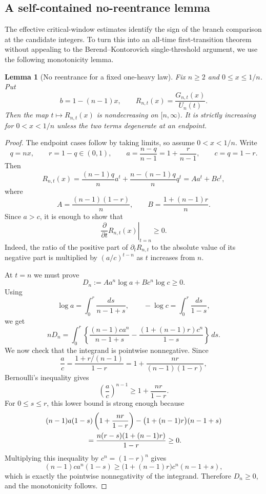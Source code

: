 \documentclass[11pt]{article}
\newtheorem{lemma}[theorem]{Lemma}
\theoremstyle{definition}
\begin{document}
\subsection{A self-contained no-reentrance lemma}

The effective critical-window estimates identify the sign of the branch comparison at the candidate integers.  To turn this into an all-time first-transition theorem without appealing to the Berend--Kontorovich single-threshold argument, we use the following monotonicity lemma.

\begin{lemma}[No reentrance for a fixed one-heavy law]\label{lem:no-reentrance-fixed}
Fix $n\ge2$ and $0\le x\le 1/n$.  Put
\[
  b=1-(n-1)x,
  \qquad
  R_{n,t}(x)=\frac{G_{n,t}(x)}{U_n(t)}.
\]
Then the map $t\mapsto R_{n,t}(x)$ is nondecreasing on $[n,\infty)$.  It is strictly increasing for $0<x<1/n$ unless the two terms degenerate at an endpoint.
\end{lemma}

\begin{proof}
The endpoint cases follow by taking limits, so assume $0<x<1/n$.  Write
\[
  q=nx,
  \qquad
  r=1-q\in(0,1),
  \qquad
  a=\frac{n-q}{n-1}=1+\frac{r}{n-1},
  \qquad
  c=q=1-r.
\]
Then
\[
  R_{n,t}(x)
  =\frac{(n-1)q}{n}a^t+\frac{n-(n-1)q}{n}q^t
  =A a^t+B c^t,
\]
where
\[
  A=\frac{(n-1)(1-r)}{n},
  \qquad
  B=\frac{1+(n-1)r}{n}.
\]
Since $a>c$, it is enough to show that
\[
  \left.\frac{\partial}{\partial t}R_{n,t}(x)\right|_{t=n}\ge0.
\]
Indeed, the ratio of the positive part of $\partial_tR_{n,t}$ to the absolute value of its negative part is multiplied by $(a/c)^{t-n}$ as $t$ increases from $n$.

At $t=n$ we must prove
\[
  D_n:=A a^n\log a+B c^n\log c\ge0.
\]
Using
\[
  \log a=\int_0^r\frac{ds}{n-1+s},
  \qquad
  -\log c=\int_0^r\frac{ds}{1-s},
\]
we get
\[
  nD_n=
  \int_0^r
  \left\{
  \frac{(n-1)c a^n}{n-1+s}
  -
  \frac{(1+(n-1)r)c^n}{1-s}
  \right\}\,ds .
\]
We now check that the integrand is pointwise nonnegative.  Since
\[
  \frac ac
  =\frac{1+r/(n-1)}{1-r}
  =1+\frac{nr}{(n-1)(1-r)},
\]
Bernoulli's inequality gives
\[
  \left(\frac ac\right)^{n-1}
  \ge 1+\frac{nr}{1-r}.
\]
For \(0\le s\le r\), this lower bound is strong enough because
\begin{align*}
 &(n-1)a(1-s)\left(1+\frac{nr}{1-r}\right)
      -\bigl(1+(n-1)r\bigr)(n-1+s) \\
 &\hspace{20mm}
 =\frac{n(r-s)(1+(n-1)r)}{1-r}\ge0.
\end{align*}
Multiplying this inequality by \(c^n=(1-r)^n\) gives
\[
  (n-1)c a^n(1-s)
  \ge
  \bigl(1+(n-1)r\bigr)c^n(n-1+s),
\]
which is exactly the pointwise nonnegativity of the integrand. Therefore
\(D_n\ge0\), and the monotonicity follows.
\end{proof}
\end{document}
